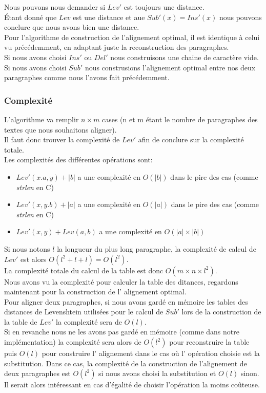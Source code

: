 \documentclass{article}
\begin{document}
Nous pouvons nous demander si $Lev'$ est toujours une distance.\\
Étant donné que $Lev$ est une distance et aue $Sub'(x)=Ins'(x)$ nous pouvons
conclure que nous avons bien une distance.\\


Pour l'algorithme de construction de l'alignement optimal, il est identique à
celui vu précédemment, en adaptant juste la reconstruction des paragraphes.\\
Si nous avons choisi $Ins'$ ou $Del'$ nous construisons une chaine de caractère
vide.\\
Si nous avons choisi $Sub'$ nous construsions l'alignement optimal entre nos
deux paragraphes comme nous l'avons fait précédemment.

\subsubsection{Complexité}

L'algorithme va remplir $n \times m$ cases (n et m étant le nombre de
paragraphes des textes que nous souhaitons aligner).\\
Il faut donc trouver la complexité de $Lev'$ afin de conclure sur la complexité
totale.\\
Les complexités des différentes opérations sont:
\begin{itemize}
	\item $Lev'(x.a,y) + \lvert b \rvert$ a une complexité en $O(\lvert b
		\rvert)$ dans le pire des cas (comme \textit{strlen} en C) 
	\item $Lev'(x,y.b) + \lvert a \rvert$ a une complexité en $O(\lvert a
		\rvert)$ dans le pire des cas (comme \textit{strlen} en C) 
	\item $Lev'(x,y) + Lev(a,b)$ a une complexité en $O( \lvert a \rvert \times
		\lvert b \rvert)$
\end{itemize}

Si nous notons $l$ la longueur du plus long paragraphe, la complexité de calcul
de $Lev'$ est alors $O(l^2+l+l) = O(l^2)$.\\
La complexité totale du calcul de la table est donc $O(m \times n \times l^2)$.\\

Nous avons vu la complexité pour calculer la table des ditances, regardons
maintenant pour la construction de l' alignement optimal.\\
Pour aligner deux paragraphes, si nous avons gardé en mémoire les tables des
distances de Levenshtein utilisées pour le calcul de $Sub'$ lors de la
construction de la table de $Lev'$ la complexité sera de $O(l)$.\\
Si en revanche nous ne les avons pas gardé en mémoire (comme dans notre
implémentation) la complexité sera alors de $O(l^2)$ pour reconstruire la table
puis $O(l)$ pour construire l' alignement dans le cas où l' opération choisie
est la substitution. Dans ce cas, la complexité de la construction de
l'alignement de deux paragraphes est $O(l^2)$ si nous avons choisi la
substitution et $O(l)$ sinon. Il serait alors intéressant en cas d'égalité de
choisir l'opération la moins coûteuse.
\end{document}
